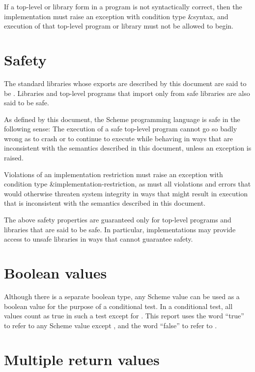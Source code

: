 If a top-level or library form in a program is not syntactically
correct, then the implementation must raise an exception with
condition type {\cf\&syntax}, and execution of that top-level program
or library must not be allowed to begin.

\section{Safety}
\label{safetysection}

The standard libraries whose exports are described by this document
are said to be .  Libraries and top-level
programs that import only from safe libraries are also said to be safe.

As defined by this document, the Scheme programming language
is safe in the following sense:
The execution of a safe top-level program
cannot go so badly wrong as to crash or to continue to
execute while behaving in ways that are
inconsistent with the semantics described in this document,
unless an exception is raised.

Violations of an implementation restriction must raise an
exception with condition type {\cf\&implementation-\hp{}restriction},
as must all
violations and errors that would otherwise threaten system
integrity in ways that might result in execution that is
inconsistent with the semantics described in this document.

The above safety properties are guaranteed only for top-level programs
and libraries that are said to be safe.  In particular,
implementations may provide access to unsafe libraries in ways that
cannot guarantee safety.

\section{Boolean values}
\label{booleanvaluessection}

Although there is a separate boolean type, any Scheme value can be
used as a boolean value for the purpose of a conditional test.  In a
conditional test, all values count as true in such a test except for
\schfalse{}.  This report uses the word ``true'' to refer to any
Scheme value except \schfalse{}, and the word ``false'' to refer to
\schfalse{}.  

\section{Multiple return values}
\label{multiplereturnvaluessection}

